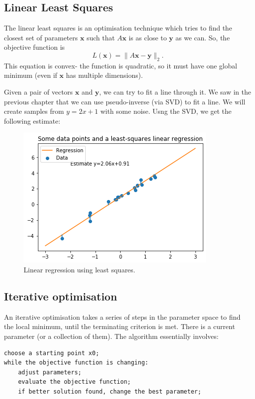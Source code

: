 \documentclass[a4paper, openany]{memoir}
\begin{document}
\subsection{Linear Least Squares}
The linear least squares is an optimisation technique which tries to find the closest set of parameters $\mathbf{x}$ such that $A \mathbf{x}$ is as close to $\mathbf{y}$ as we can. So, the objective function is
\[L(\mathbf{x}) = \lVert A \mathbf{x} - \mathbf{y} \rVert_2.\]
This equation is convex- the function is quadratic, so it must have one global minimum (even if $\mathbf{x}$ has multiple dimensions). 

Given a pair of vectors $\mathbf{x}$ and $\mathbf{y}$, we can try to fit a line through it. We saw in the previous chapter that we can use pseudo-inverse (via SVD) to fit a line. We will create samples from $y = 2x + 1$ with some noise. Usng the SVD, we get the following estimate:
\begin{figure}[H]
    \centering
    \includegraphics[scale=0.5]{src/4.11 linear regression least squares.png}
    \caption{Linear regression using least squares.}
\end{figure}

\subsection{Iterative optimisation}
An iterative optimisation takes a series of steps in the parameter space to find the local minimum, until the terminating criterion is met. There is a current parameter (or a collection of them). The algorithm essentially involves:
\begin{verbatim}
choose a starting point x0;
while the objective function is changing:
    adjust parameters;
    evaluate the objective function;
    if better solution found, change the best parameter;
\end{verbatim}
\end{document}
